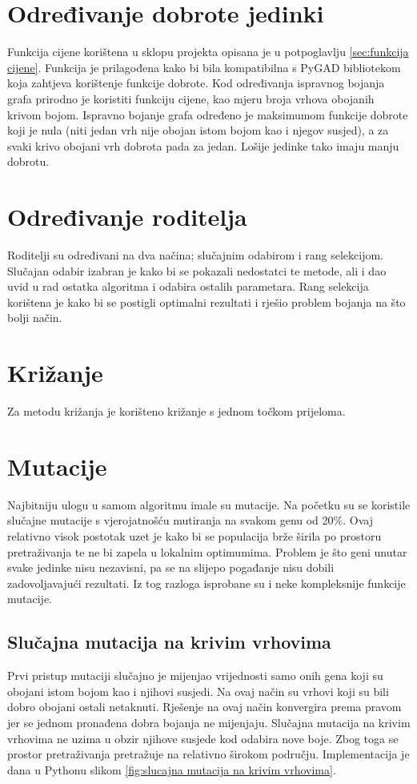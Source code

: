 \documentclass[times, utf8, zavrsni]{fer}
\begin{document}
\section{Određivanje dobrote jedinki}
Funkcija cijene korištena u sklopu projekta opisana je u potpoglavlju \ref{sec:funkcija cijene}. Funkcija je prilagođena kako bi bila kompatibilna s PyGAD bibliotekom koja zahtjeva korištenje funkcije dobrote. Kod određivanja ispravnog bojanja grafa prirodno je koristiti funkciju cijene, kao mjeru broja vrhova obojanih krivom bojom. Ispravno bojanje grafa određeno je maksimumom funkcije dobrote koji je nula (niti jedan vrh nije obojan istom bojom kao i njegov susjed), a za svaki krivo obojani vrh dobrota pada za jedan. Lošije jedinke tako imaju manju dobrotu.

\section{Određivanje roditelja}
Roditelji su određivani na dva načina; slučajnim odabirom i rang selekcijom. Slučajan odabir izabran je kako bi se pokazali nedostatci te metode, ali i dao uvid u rad ostatka algoritma i odabira ostalih parametara. Rang selekcija korištena je kako bi se postigli optimalni rezultati i rješio problem bojanja na što bolji način.

\section{Križanje}
Za metodu križanja je korišteno križanje s jednom točkom prijeloma.

\section{Mutacije}
Najbitniju ulogu u samom algoritmu imale su mutacije. Na početku su se koristile slučajne mutacije s vjerojatnošću mutiranja na svakom genu od 20\%. Ovaj relativno visok postotak uzet je kako bi se populacija brže širila po prostoru pretraživanja te ne bi zapela u lokalnim optimumima. Problem je što geni unutar svake jedinke nisu nezavisni, pa se na slijepo pogađanje nisu dobili zadovoljavajući rezultati. Iz tog razloga isprobane su i neke kompleksnije funkcije mutacije. 

\subsection{Slučajna mutacija na krivim vrhovima}
\label{sec: slucajna mutacija na krivim vrhovima}
Prvi pristup mutaciji slučajno je mijenjao vrijednosti samo onih gena koji su obojani istom bojom kao i njihovi susjedi. Na ovaj način su vrhovi koji su bili dobro obojani ostali netaknuti. Rješenje na ovaj način konvergira prema pravom jer se jednom pronađena dobra bojanja ne mijenjaju. Slučajna mutacija na krivim vrhovima ne uzima u obzir njihove susjede kod odabira nove boje. Zbog toga se prostor pretraživanja pretražuje na relativno širokom području. Implementacija je dana u Pythonu slikom \ref{fig:slucajna mutacija na krivim vrhovima}.
\end{document}

